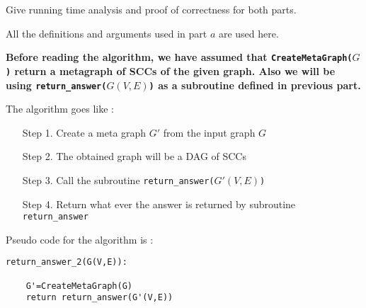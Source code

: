 \documentclass[answers]{exam}
\begin{document}
\begin{questions}

Give running time analysis and proof of correctness for both parts.

\begin{solution}
    
 All the definitions and arguments used in part $a$ are used here.

\textbf{Before reading the algorithm, we have assumed that {\tt CreateMetaGraph($G$)} return a metagraph of SCCs of the given graph. Also we will be using {\tt return\_answer($G(V,E)$)} as a subroutine defined in previous part.}\par

 
The algorithm goes like :
\begin{enumerate}
    \item [Step 1.] Create a meta graph $G'$ from the input graph $G$
    \item [Step 2.] The obtained graph will be a DAG of SCCs
    \item [Step 3.] Call the subroutine {\tt return\_answer($G'(V,E)$)}
    \item [Step 4.] Return what ever the answer is returned by subroutine {\tt return\_answer}
    
\end{enumerate}


Pseudo code for the algorithm is :

\begin{verbatim}
return_answer_2(G(V,E)):

    G'=CreateMetaGraph(G)
    return return_answer(G'(V,E))
\end{verbatim}


\end{solution}
\end{questions}
\end{document}
